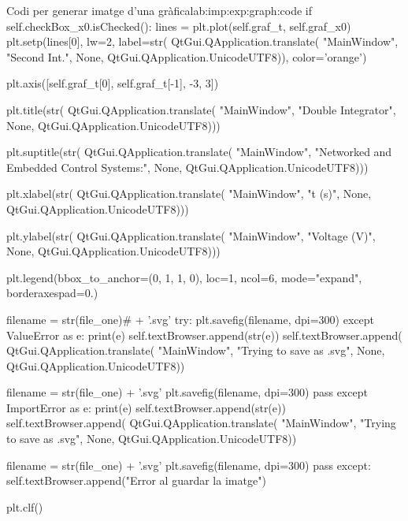 \begin{code_python}{Codi per generar imatge d'una gràfica}{lab:imp:exp:graph:code}
        if self.checkBox_x0.isChecked():
            lines = plt.plot(self.graf_t, self.graf_x0)
            plt.setp(lines[0], 
                     lw=2, 
                     label=str(
                        QtGui.QApplication.translate(
                            "MainWindow", 
                            "Second Int.", 
                            None, 
                            QtGui.QApplication.UnicodeUTF8)), 
                     color='orange')

        plt.axis([self.graf_t[0], self.graf_t[-1], -3, 3])
        
        plt.title(str(
            QtGui.QApplication.translate(
                "MainWindow", 
                "Double Integrator", 
                None, 
                QtGui.QApplication.UnicodeUTF8)))
        
        plt.suptitle(str(
            QtGui.QApplication.translate(
                "MainWindow", 
                "Networked and Embedded Control Systems:", 
                None, 
                QtGui.QApplication.UnicodeUTF8)))
        
        plt.xlabel(str(
            QtGui.QApplication.translate(
                "MainWindow", 
                "t (s)", 
                None, 
                QtGui.QApplication.UnicodeUTF8)))
        
        plt.ylabel(str(
            QtGui.QApplication.translate(
                "MainWindow", 
                "Voltage (V)", 
                None, 
                QtGui.QApplication.UnicodeUTF8)))
        
        plt.legend(bbox_to_anchor=(0, 1, 1, 0), loc=1, ncol=6, mode="expand", borderaxespad=0.)
               
        filename = str(file_one)# + '.svg'
        try:
            plt.savefig(filename, dpi=300)
        except ValueError as e:
            print(e)
            self.textBrowser.append(str(e))
            self.textBrowser.append(
                QtGui.QApplication.translate(
                    "MainWindow", 
                    "Trying to save as .svg", 
                    None, 
                    QtGui.QApplication.UnicodeUTF8))
            
            filename = str(file_one) + '.svg'
            plt.savefig(filename, dpi=300)
            pass
        except ImportError as e:
            print(e)
            self.textBrowser.append(str(e))
            self.textBrowser.append(
                QtGui.QApplication.translate(
                    "MainWindow", 
                    "Trying to save as .svg", 
                    None, 
                    QtGui.QApplication.UnicodeUTF8))
            
            filename = str(file_one) + '.svg'
            plt.savefig(filename, dpi=300)
            pass
        except:
            self.textBrowser.append("Error al guardar la imatge")
        
        plt.clf()
\end{code_python}

